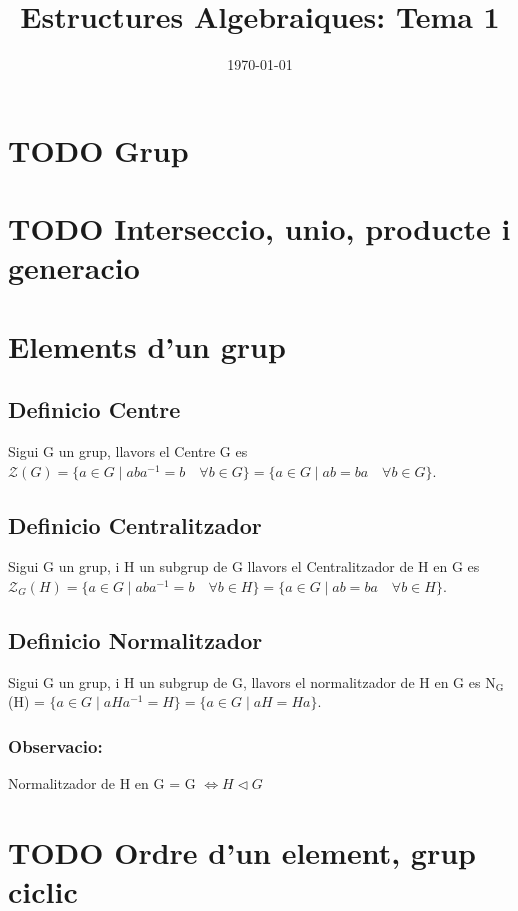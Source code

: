 \documentclass[11pt]{article}
\date{\today}
\title{Estructures Algebraiques: Tema 1}
\begin{document}
\maketitle
\setcounter{tocdepth}{4}
\tableofcontents


\section{{\bfseries\sffamily TODO} Grup}
\label{sec:org654da55}
\section{{\bfseries\sffamily TODO} Interseccio, unio, producte i generacio}
\label{sec:orgeb1d7e2}
\section{Elements d'un grup}
\label{sec:orge2e4030}
\subsection{Definicio Centre}
\label{sec:org0ed0424}
Sigui G un grup, llavors el Centre G es \(\mathcal{Z}(G) = \{ a \in G \mid aba^{-1} = b \quad \forall b \in G \} = \{ a \in G \mid ab = ba \quad \forall b \in G \}\).

\subsection{Definicio Centralitzador}
\label{sec:org470512c}
Sigui G un grup, i H un subgrup de G llavors el Centralitzador de H en G es \(\mathcal{Z}_{G}(H) = \{ a \in G \mid aba^{-1} = b \quad \forall b \in H \} = \{ a \in G \mid ab = ba \quad \forall b \in H \}\).

\subsection{Definicio Normalitzador}
\label{sec:org4cdd146}
Sigui G un grup, i H un subgrup de G, llavors el normalitzador de H en G es N\(_{\text{G}}\)(H) = \(\{ a \in G \mid aHa^{-1} = H \} = \{ a \in G \mid aH = Ha \}\).

\subsubsection{Observacio:}
\label{sec:orgb61e528}
Normalitzador de H en G = G \(\iff H \vartriangleleft G\)
\section{{\bfseries\sffamily TODO} Ordre d'un element, grup ciclic}
\label{sec:org8fbc9a1}
\end{document}

